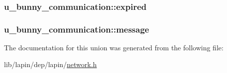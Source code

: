 \hypertarget{unionu__bunny__communication_a6cb9d1db3e8cd2e766333782e78b9fe2}{
\subsubsection[{expired}]{ u\-\_\-bunny\-\_\-communication\-::expired}}\label{unionu__bunny__communication_a6cb9d1db3e8cd2e766333782e78b9fe2}
\hypertarget{unionu__bunny__communication_a1569044b8423108f0ef62be05de944c3}{
\subsubsection[{message}]{ u\-\_\-bunny\-\_\-communication\-::message}}\label{unionu__bunny__communication_a1569044b8423108f0ef62be05de944c3}


The documentation for this union was generated from the following file\-:\begin{DoxyCompactItemize}
\item 
lib/lapin/dep/lapin/\hyperlink{network_8h}{network.\-h}\end{DoxyCompactItemize}
